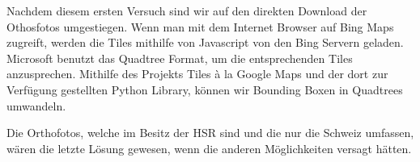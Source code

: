 Nachdem diesem ersten Versuch sind wir auf den direkten Download der Othosfotos umgestiegen. Wenn man mit dem Internet Browser auf Bing Maps zugreift, werden die \Gls{Tile}s mithilfe von Javascript von den Bing Servern geladen. Microsoft benutzt das Quadtree Format, um die entsprechenden Tiles anzusprechen. Mithilfe des Projekts Tiles à la Google Maps \cite{Tiles} und der dort zur Verfügung gestellten Python Library, können wir Bounding Boxen in Quadtrees umwandeln.

Die Orthofotos, welche im Besitz der HSR sind und die nur die Schweiz umfassen, wären die letzte Lösung gewesen, wenn die anderen Möglichkeiten versagt hätten.
